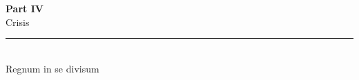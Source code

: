 \documentclass[12pt, a5paper, twoside]{book}
\let\cleardoublepage\clearpage %
\begin{document}


\cleardoublepage
\thispagestyle{empty}
\vspace*{\fill}
\begin{center}
    {\normalfont\huge\bfseries Part IV}\\[0.5cm]
    {\Huge Crisis}\\[1ex]
    \rule[0.5ex]{5cm}{0.5pt}\\[1ex]
    {\small Regnum in se divisum}
\end{center}
\vspace*{\fill}
\cleardoublepage





















\cleardoublepage
\thispagestyle{empty}

\vspace*{\fill}
\cleardoublepage
\end{document}
